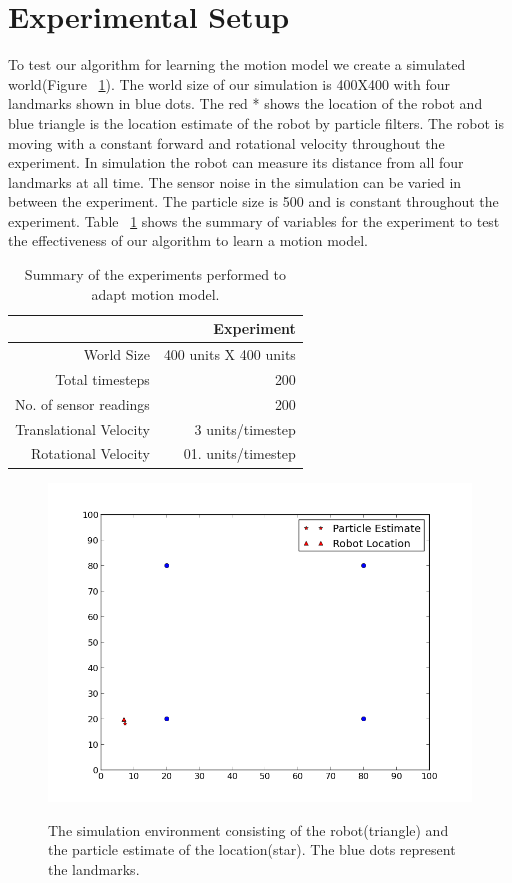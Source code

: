\documentclass[12pt]{dalcsthesis}
\begin{document}
\section{Experimental Setup}
To test our algorithm for learning the motion model we create a simulated world(Figure ~\ref{fig-: simulation world}). The world size of our simulation is 400X400 with four landmarks shown in blue dots. The red * shows the location of the robot and blue triangle is the location estimate of the  robot by particle filters. The robot is moving with a constant forward and rotational velocity throughout the experiment. In simulation the robot can measure its distance from all four landmarks at all time. The sensor noise in the simulation can be varied in between the experiment. The particle size is 500 and is constant throughout the experiment. Table ~\ref{tab-constant parameters} shows the summary of variables for the experiment to test the effectiveness of our algorithm to learn a motion model.
\begin{table}[tbh]
\centering
\begin{tabular}{|r|r|}
    \hline
    & Experiment \\
    \hline \hline
    World Size & 400 units X 400 units\\
    \hline
    Total timesteps & 200  \\
    \hline
    No. of sensor readings & 200 \\
    \hline
    Translational Velocity & 3 units/timestep \\
    \hline
    Rotational Velocity & 01. units/timestep \\
    \hline
\end{tabular}
 \caption{\label{tab-constant parameters}Summary of the experiments performed to adapt motion model.}
\end{table}

\begin{figure}
  \centering
     {\includegraphics[height = 3.0 in]{0.png}}
  \caption{\label{fig-: simulation world}The simulation environment consisting of the robot(triangle) and the particle estimate of the location(star). The blue dots represent the landmarks.}
\end{figure}
\end{document}
